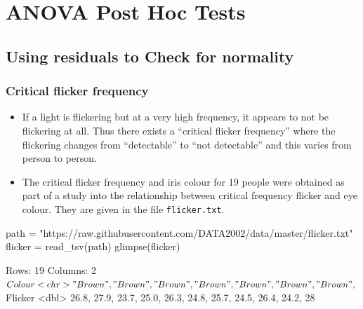 \documentclass[a4paper]{article}
\begin{document}
\section{ANOVA Post Hoc Tests}\label{sec:22}
\subsection{Using residuals to Check for normality}
\subsubsection{Critical flicker frequency}
\begin{itemize}
	\item If a light is flickering but at a very high frequency, it appears to not be flickering at all. Thus there exists a ``critical flicker frequency'' where the flickering changes from ``detectable'' to ``not detectable'' and this varies from person to person.
	\item The critical flicker frequency and iris colour for 19 people were obtained as part of a study into the relationship between critical frequency flicker and eye colour. They are given in the file \lstinline|flicker.txt|.
\end{itemize}
\begin{Schunk}
\begin{Sinput}
path = "https://raw.githubusercontent.com/DATA2002/data/master/flicker.txt"
flicker = read_tsv(path)
glimpse(flicker)
\end{Sinput}
\begin{Soutput}
Rows: 19
Columns: 2
$ Colour  <chr> "Brown", "Brown", "Brown", "Brown", "Brown", "Brown", "Brown",~
$ Flicker <dbl> 26.8, 27.9, 23.7, 25.0, 26.3, 24.8, 25.7, 24.5, 26.4, 24.2, 28~
\end{Soutput}
\end{Schunk}
\end{document}
